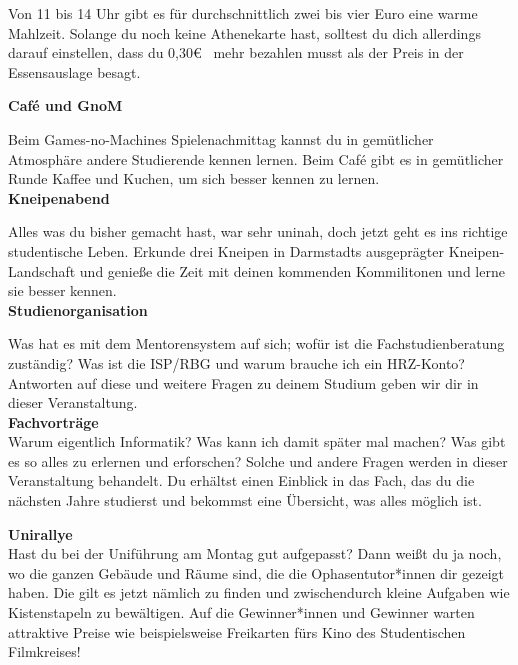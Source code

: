 {    Von 11 bis 14 Uhr gibt es für durchschnittlich zwei bis vier Euro eine warme Mahlzeit. Solange du noch keine Athenekarte hast, solltest du dich allerdings darauf einstellen, dass du 0,30\euro~ mehr bezahlen musst als der Preis in der Essensauslage besagt.


    \noindent\textbf{Caf\'e und GnoM}

    Beim Games-no-Machines Spielenachmittag kannst du in gemütlicher Atmosphäre andere Studierende kennen lernen. Beim Caf\'e gibt es in gemütlicher Runde Kaffee und Kuchen, um sich besser kennen zu lernen.\\

    \noindent\textbf{Kneipenabend}

    Alles was du bisher gemacht hast, war sehr uninah, doch jetzt geht es ins richtige studentische Leben.
    Erkunde drei Kneipen in Darmstadts ausgeprägter Kneipen-Landschaft und genieße die Zeit mit deinen kommenden Kommilitonen und lerne sie besser kennen. \\
    \newpage
    \noindent\textbf{Studienorganisation}

    Was hat es mit dem Mentorensystem auf sich; wofür ist die Fachstudienberatung zuständig? Was ist die ISP/RBG und warum  brauche ich ein HRZ-Konto? Antworten auf diese und weitere Fragen zu deinem Studium geben wir dir in dieser Veranstaltung.\\

    \noindent\textbf{Fachvorträge}\\
    Warum eigentlich Informatik? Was kann ich damit später mal machen? Was gibt es so alles zu erlernen und erforschen? Solche und andere Fragen werden in dieser Veranstaltung behandelt. Du erhältst einen Einblick in das Fach, das du die nächsten Jahre studierst und bekommst eine Übersicht, was alles möglich ist. %

    \noindent\textbf{Unirallye}\\
    Hast du bei der Uniführung am Montag gut aufgepasst? Dann weißt du ja noch, wo die ganzen Gebäude und Räume sind, die die Ophasentutor*innen dir gezeigt haben. Die gilt es jetzt nämlich zu finden und zwischendurch kleine Aufgaben wie Kistenstapeln zu bewältigen. Auf die Gewinner*innen und Gewinner warten attraktive Preise wie beispielsweise Freikarten fürs Kino des Studentischen Filmkreises!\\

}
